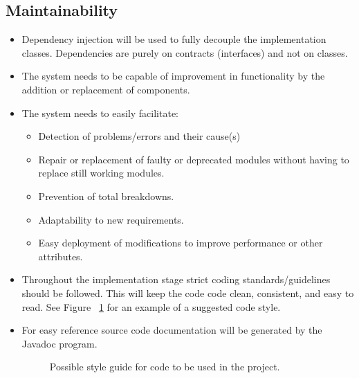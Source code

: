 \documentclass[a4paper,12pt]{article}
\begin{document}
\subsection{Maintainability}
\begin{itemize}
	\item Dependency injection will be used to fully decouple the implementation classes. Dependencies are purely on contracts (interfaces) and not on classes.
	\item The system needs to be capable of improvement in functionality by the addition or replacement of components.
	\item The system needs to easily facilitate:
	\begin{itemize}
		\item Detection of problems/errors and their cause(s)
		\item Repair or replacement of faulty or deprecated modules without having to replace still working modules.
		\item Prevention of total breakdowns.
		\item Adaptability to new requirements.
		\item Easy deployment of modifications to improve performance or other attributes.
	\end{itemize}
	\item Throughout the implementation stage strict coding standards/guidelines should be followed. This will keep the code code clean, consistent, and easy to read. See Figure ~\ref{fig:posibCodeStyle} for an example of a suggested code style.
	\item For easy reference source code documentation will be generated by the Javadoc program.
	\begin{figure}[H]
		\fbox{}
		\caption{Possible style guide for code to be used in the project.}
		\label{fig:posibCodeStyle}
	\end{figure}
\end{itemize}
\end{document}
